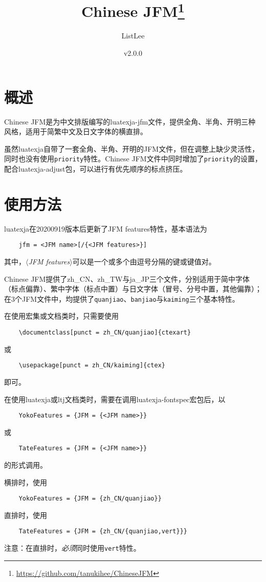 \documentclass[a4paper , zihao=-4 , fontset=adobe , punct=zh_CN/kaiming]{ctexart}
\title{\textbf{\textsf{Chinese JFM}}\thanks{\url{https://github.com/tanukihee/ChineseJFM}}}
\author{ListLee}
\date{\zhtoday \qquad v2.0.0}
\begin{document}
\maketitle

\section{概述}
\textsf{Chinese JFM}是为中文排版编写的luatexja-jfm文件，提供全角、半角、开明三种风格，适用于简繁中文及日文字体的横直排。

虽然\textsf{luatexja}自带了一套全角、半角、开明的JFM文件，但在调整上缺少灵活性，同时也没有使用\+\verb|priority|特性。\textsf{Chinese JFM}文件中同时增加了\+\verb|priority|的设置，配合\textsf{luatexja-adjust}包，可以进行有优先顺序的标点挤压。\label{sec:pr}

\section{使用方法}
\textsf{luatexja}在20200919版本后更新了JFM features特性，基本语法为
\begin{verbatim}
    jfm = <JFM name>[/{<JFM features>}]
\end{verbatim}
其中，\(\langle\)\textit{JFM features}\(\rangle\)可以是一个或多个由逗号分隔的键或键值对。

\textsf{Chinese JFM}提供了\textsf{zh\_CN}、\textsf{zh\_TW}与\textsf{ja\_JP}三个文件，分别适用于简中字体（标点偏靠）、繁中字体（标点中置）与日文字体（冒号、分号中置，其他偏靠）；在3个JFM文件中，均提供了\+\verb|quanjiao|、\verb|banjiao|与\+\verb|kaiming|三个基本特性。

在使用\CTeX{}宏集或文档类时，只需要使用
\begin{verbatim}
    \documentclass[punct = zh_CN/quanjiao]{ctexart}
\end{verbatim}
或
\begin{verbatim}
    \usepackage[punct = zh_CN/kaiming]{ctex}
\end{verbatim}
即可。

在使用\textsf{luatexja}或\textsf{ltj}文档类时，需要在调用\textsf{luatexja-fontspec}宏包后，以\begin{verbatim}
    YokoFeatures = {JFM = {<JFM name>}}
\end{verbatim}
或
\begin{verbatim}
    TateFeatures = {JFM = {<JFM name>}}
\end{verbatim}
的形式调用。

横排时，使用
\begin{verbatim}
    YokoFeatures = {JFM = {zh_CN/quanjiao}}
\end{verbatim}
直排时，使用
\begin{verbatim}
    TateFeatures = {JFM = {zh_CN/{quanjiao,vert}}}
\end{verbatim}
{\color{red}注意：在直排时，\emph{必须}同时使用\+\verb|vert|特性。}
\end{document}
